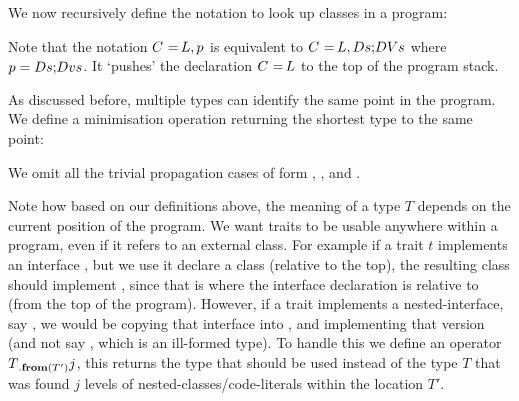 We now recursively define the notation to look up classes in a program:

\begin{defs}
\end{defs}

Note that the notation $\tld{C}{L}, p$ is equivalent to $\prog{\tld{C}{L},Ds}{DVs}$ where $p = \prog{Ds}{Dvs}$. It `pushes' the declaration $\tld{C}{L}$ to the top of the program stack.


As discussed before, multiple types can identify the same point in the program.
We define a minimisation operation returning the shortest type to the same point:

\begin{defs}
\end{defs}
We omit all the trivial propagation cases of form , ,  and .

Note how based on our definitions above, the meaning of a type $T$ depends on the current position of the program. We want traits to be usable anywhere within a program, even if it refers to an external class. For example if a trait $t$ implements an interface , but we use it declare a class  (relative to the top), the resulting class should implement , since that is where the interface declaration is relative to  (from the top of the program). However, if a trait implements a nested-interface, say , we would be copying that interface into , and implementing that version (and not say , which is an ill-formed type). To handle this we define an operator $T{{}_{.\textbf{from}({T'})}}{j}$, this returns the type that should be used instead of the type $T$ that was found $j$ levels of nested-classes/code-literals within the location $T'$.


